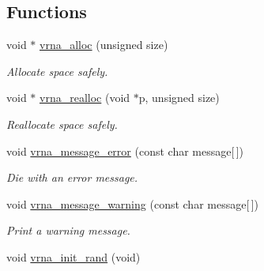 \subsection*{Functions}
\begin{DoxyCompactItemize}
\item 
void $\ast$ \hyperlink{group__utils_gaf37a0979367c977edfb9da6614eebe99}{vrna\-\_\-alloc} (unsigned size)
\begin{DoxyCompactList}\small\item\em Allocate space safely. \end{DoxyCompactList}\item 
void $\ast$ \hyperlink{group__utils_ga27f4719a66c6f90d1cca3d1e6e696c6a}{vrna\-\_\-realloc} (void $\ast$p, unsigned size)
\begin{DoxyCompactList}\small\item\em Reallocate space safely. \end{DoxyCompactList}\item 
void \hyperlink{group__utils_gabb76f8f8dbd652fa4a24037cf4524373}{vrna\-\_\-message\-\_\-error} (const char message\mbox{[}$\,$\mbox{]})
\begin{DoxyCompactList}\small\item\em Die with an error message. \end{DoxyCompactList}\item 
void \hyperlink{group__utils_gafe4072406bd287c6857763dd7d2fe1f1}{vrna\-\_\-message\-\_\-warning} (const char message\mbox{[}$\,$\mbox{]})
\begin{DoxyCompactList}\small\item\em Print a warning message. \end{DoxyCompactList}\item 
\hypertarget{group__utils_ga0ad1f40ea316e5c5918695c35613027a}{void \hyperlink{group__utils_ga0ad1f40ea316e5c5918695c35613027a}{vrna\-\_\-init\-\_\-rand} (void)}\label{group__utils_ga0ad1f40ea316e5c5918695c35613027a}


\end{DoxyCompactItemize}
